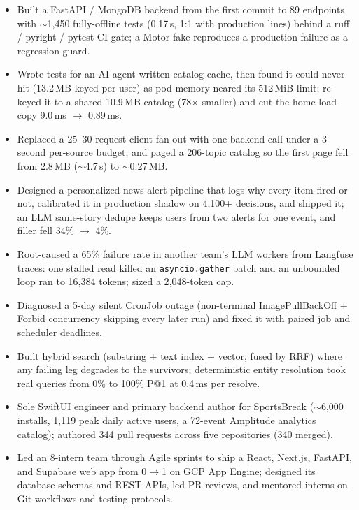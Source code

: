 \documentclass[11pt, letterpaper]{article}
\begin{document}
\begin{itemize}
  \item Built a FastAPI / MongoDB backend from the first commit to 89 endpoints with $\sim$1{,}450 fully-offline tests (0.17\,s, 1:1 with production lines) behind a ruff / pyright / pytest CI gate; a Motor fake reproduces a production failure as a regression guard.
  \item Wrote tests for an AI agent-written catalog cache, then found it could never hit (13.2\,MB keyed per user) as pod memory neared its 512\,MiB limit; re-keyed it to a shared 10.9\,MB catalog (78$\times$ smaller) and cut the home-load copy 9.0\,ms $\to$ 0.89\,ms.
  \item Replaced a 25--30 request client fan-out with one backend call under a 3-second per-source budget, and paged a 206-topic catalog so the first page fell from 2.8\,MB ($\sim$4.7\,s) to $\sim$0.27\,MB.
  \item Designed a personalized news-alert pipeline that logs why every item fired or not, calibrated it in production shadow on 4{,}100+ decisions, and shipped it; an LLM same-story dedupe keeps users from two alerts for one event, and filler fell 34\% $\to$ 4\%.
  \item Root-caused a 65\% failure rate in another team's LLM workers from Langfuse traces: one stalled read killed an \texttt{asyncio.gather} batch and an unbounded loop ran to 16{,}384 tokens; sized a 2{,}048-token cap.
  \item Diagnosed a 5-day silent CronJob outage (non-terminal ImagePullBackOff + Forbid concurrency skipping every later run) and fixed it with paired job and scheduler deadlines.
  \item Built hybrid search (substring + text index + vector, fused by RRF) where any failing leg degrades to the survivors; deterministic entity resolution took real queries from 0\% to 100\% P@1 at 0.4\,ms per resolve.
  \item Sole SwiftUI engineer and primary backend author for \href{https://apps.apple.com/app/id6762649287}{SportsBreak} ($\sim$6{,}000 installs, 1{,}119 peak daily active users, a 72-event Amplitude analytics catalog); authored 344 pull requests across five repositories (340 merged).
\end{itemize}

\vspace{1pt}
\begin{itemize}
  \item Led an 8-intern team through Agile sprints to ship a React, Next.js, FastAPI, and Supabase web app from 0$\to$1 on GCP App Engine; designed its database schemas and REST APIs, led PR reviews, and mentored interns on Git workflows and testing protocols.
\end{itemize}
\end{document}
